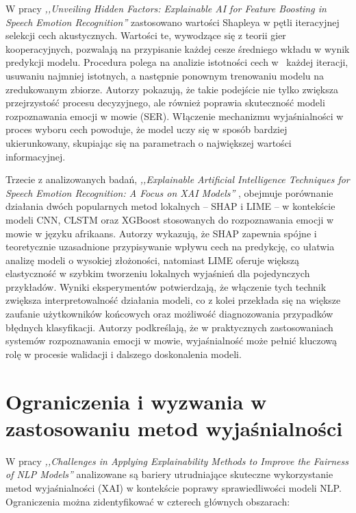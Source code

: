 \documentclass[wmii, inf, mgr]{uwmthesis}
\begin{document}
W pracy \textit{,,Unveiling Hidden Factors: Explainable AI for Feature Boosting in Speech Emotion Recognition''} \cite{UnveilingHidden} zastosowano wartości Shapleya w pętli iteracyjnej selekcji cech akustycznych. Wartości te, wywodzące się z teorii gier kooperacyjnych, pozwalają na przypisanie każdej cesze średniego wkładu w wynik predykcji modelu. Procedura polega na analizie istotności cech w~ każdej iteracji, usuwaniu najmniej istotnych, a następnie ponownym trenowaniu modelu na zredukowanym zbiorze. Autorzy pokazują, że takie podejście nie tylko zwiększa przejrzystość procesu decyzyjnego, ale również poprawia skuteczność modeli rozpoznawania emocji w mowie (SER). Włączenie mechanizmu wyjaśnialności w proces wyboru cech powoduje, że model uczy się w sposób bardziej ukierunkowany, skupiając się na parametrach o największej wartości informacyjnej.

Trzecie z analizowanych badań, \textit{,,Explainable Artificial Intelligence Techniques for Speech Emotion Recognition: A Focus on XAI Models''} \cite{ExplainableArtificial}, obejmuje porównanie działania dwóch popularnych metod lokalnych -- SHAP i LIME --  w kontekście modeli CNN, CLSTM oraz XGBoost stosowanych do rozpoznawania emocji w mowie w języku afrikaans. Autorzy wykazują, że SHAP zapewnia spójne i teoretycznie uzasadnione przypisywanie wpływu cech na predykcję, co ułatwia analizę modeli o wysokiej złożoności, natomiast LIME oferuje większą elastyczność w szybkim tworzeniu lokalnych wyjaśnień dla pojedynczych przykładów. Wyniki eksperymentów potwierdzają, że włączenie tych technik zwiększa interpretowalność działania modeli, co z kolei przekłada się na większe zaufanie użytkowników końcowych oraz możliwość diagnozowania przypadków błędnych klasyfikacji. Autorzy podkreślają, że w praktycznych zastosowaniach systemów rozpoznawania emocji w mowie, wyjaśnialność może pełnić kluczową rolę w procesie walidacji i dalszego doskonalenia modeli.


\section{Ograniczenia i wyzwania w zastosowaniu metod wyjaśnialności}
W pracy \textit{,,Challenges in Applying Explainability Methods to Improve the Fairness of NLP Models''} \cite{ChallengesExplainability} analizowane są bariery utrudniające skuteczne wykorzystanie metod wyjaśnialności (XAI) w kontekście poprawy sprawiedliwości modeli NLP. Ograniczenia można zidentyfikować w czterech głównych obszarach:
\end{document}
